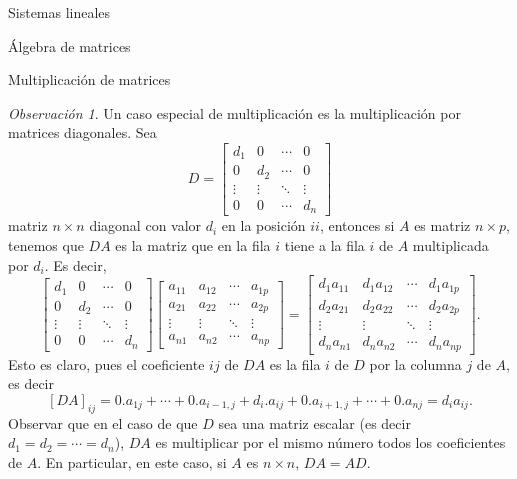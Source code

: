 \documentclass[a4paper,12pt,twoside,spanish]{amsbook}
\theoremstyle{definition}
\theoremstyle{remark}
\newtheorem{observacion}{Observaci\'on}[section]
\begin{document}
\begin{chapter}{Sistemas lineales}
\begin{section}{Álgebra de matrices}
\begin{subsection}{Multiplicación de matrices}
				\begin{observacion}
					Un  caso especial de multiplicación es la multiplicación por matrices diagonales. Sea 
				\begin{equation*}
					D = \begin{bmatrix}
					d_1 & 0 & \cdots &0 \\
					0 & d_2 & \cdots &0 \\
					\vdots & \vdots & \ddots &\vdots \\
					0 & 0 & \cdots & d_n 
					\end{bmatrix}
				\end{equation*}
				matriz $n \times n$ diagonal con valor $d_i$  en la posición $ii$,  entonces si $A$ es matriz $n \times p$, tenemos que $DA$  es la matriz que en la fila $i$ tiene a la fila $i$ de $A$ multiplicada por $d_i$.  Es decir,
				\begin{equation*}
				\begin{bmatrix}
				d_1 & 0 & \cdots &0 \\
				0 & d_2 & \cdots &0 \\
				\vdots & \vdots & \ddots &\vdots \\
				0 & 0 & \cdots & d_n 
				\end{bmatrix}
				\begin{bmatrix}
				a_{11} & a_{12} & \cdots &a_{1p} \\
				a_{21} & a_{22} & \cdots &a_{2p}\\
				\vdots & \vdots & \ddots &\vdots \\
				a_{n1} & a_{n2} & \cdots & a_{np} 
				\end{bmatrix}
				=
				\begin{bmatrix}
				d_1a_{11} & d_1a_{12} & \cdots &d_1a_{1p} \\
				d_2a_{21} & d_2a_{22} & \cdots &d_2a_{2p}\\
				\vdots & \vdots & \ddots &\vdots \\
				d_n a_{n1} & d_n a_{n2} & \cdots & d_n a_{np} 
				\end{bmatrix}.
				\end{equation*}
				Esto es claro, pues el coeficiente $ij$  de $DA$ es la fila $i$ de $D$ por la columna $j$ de $A$, es decir
				$$
				[DA]_{ij} = 0.a_{1j}+\cdots + 0.a_{i-1,j}+d_i.a_{ij}+0.a_{i+1,j}+\cdots + 0.a_{nj} = d_ia_{ij}. 
				$$
				Observar que en el caso de que $D$ sea una matriz escalar (es decir $d_1=d_2=\cdots=d_n$), $DA$ es multiplicar por el mismo número todos los coeficientes de $A$. En particular, en este caso, si $A$  es $n \times n$,  $DA = AD$.
				 

\end{observacion}
\end{subsection}
\end{section}
\end{chapter}
\end{document}
